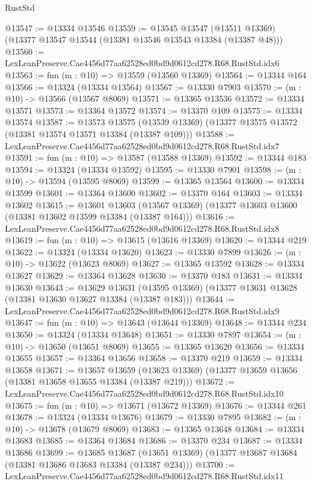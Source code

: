 \begin{lexlean}{RustStd}
\begin{coremodule}
@13547 := @13334 @13546
@13559 := @13545
    @13547
    (@13511 @13369)
    (@13377 @13547 @13544 (@13381 @13546 @13543 @13384 (@13387 @48)))
@13560 := LexLeanPreserve.Cae4456d77aa62528ed0bd9d0612cd278.R68.RustStd.idx6
@13563 := fun (m : @10) => @13559 (@13560 @13369)
@13564 := @13344 @164
@13566 := @13324 (@13334 @13564)
@13567 := @13330 @7903
@13570 := (m : @10) -> @13566 (@13567 @8069)
@13571 := @13365 @13536
@13572 := @13334 @13571
@13573 := @13364 @13572
@13574 := @13370 @109
@13575 := @13334 @13574
@13587 := @13573
    @13575
    (@13539 @13369)
    (@13377 @13575 @13572 (@13381 @13574 @13571 @13384 (@13387 @109)))
@13588 := LexLeanPreserve.Cae4456d77aa62528ed0bd9d0612cd278.R68.RustStd.idx7
@13591 := fun (m : @10) => @13587 (@13588 @13369)
@13592 := @13344 @183
@13594 := @13324 (@13334 @13592)
@13595 := @13330 @7901
@13598 := (m : @10) -> @13594 (@13595 @8069)
@13599 := @13365 @13564
@13600 := @13334 @13599
@13601 := @13364 @13600
@13602 := @13370 @164
@13603 := @13334 @13602
@13615 := @13601
    @13603
    (@13567 @13369)
    (@13377 @13603 @13600 (@13381 @13602 @13599 @13384 (@13387 @164)))
@13616 := LexLeanPreserve.Cae4456d77aa62528ed0bd9d0612cd278.R68.RustStd.idx8
@13619 := fun (m : @10) => @13615 (@13616 @13369)
@13620 := @13344 @219
@13622 := @13324 (@13334 @13620)
@13623 := @13330 @7899
@13626 := (m : @10) -> @13622 (@13623 @8069)
@13627 := @13365 @13592
@13628 := @13334 @13627
@13629 := @13364 @13628
@13630 := @13370 @183
@13631 := @13334 @13630
@13643 := @13629
    @13631
    (@13595 @13369)
    (@13377 @13631 @13628 (@13381 @13630 @13627 @13384 (@13387 @183)))
@13644 := LexLeanPreserve.Cae4456d77aa62528ed0bd9d0612cd278.R68.RustStd.idx9
@13647 := fun (m : @10) => @13643 (@13644 @13369)
@13648 := @13344 @234
@13650 := @13324 (@13334 @13648)
@13651 := @13330 @7897
@13654 := (m : @10) -> @13650 (@13651 @8069)
@13655 := @13365 @13620
@13656 := @13334 @13655
@13657 := @13364 @13656
@13658 := @13370 @219
@13659 := @13334 @13658
@13671 := @13657
    @13659
    (@13623 @13369)
    (@13377 @13659 @13656 (@13381 @13658 @13655 @13384 (@13387 @219)))
@13672 := LexLeanPreserve.Cae4456d77aa62528ed0bd9d0612cd278.R68.RustStd.idx10
@13675 := fun (m : @10) => @13671 (@13672 @13369)
@13676 := @13344 @261
@13678 := @13324 (@13334 @13676)
@13679 := @13330 @7895
@13682 := (m : @10) -> @13678 (@13679 @8069)
@13683 := @13365 @13648
@13684 := @13334 @13683
@13685 := @13364 @13684
@13686 := @13370 @234
@13687 := @13334 @13686
@13699 := @13685
    @13687
    (@13651 @13369)
    (@13377 @13687 @13684 (@13381 @13686 @13683 @13384 (@13387 @234)))
@13700 := LexLeanPreserve.Cae4456d77aa62528ed0bd9d0612cd278.R68.RustStd.idx11

\end{coremodule}
\end{lexlean}
